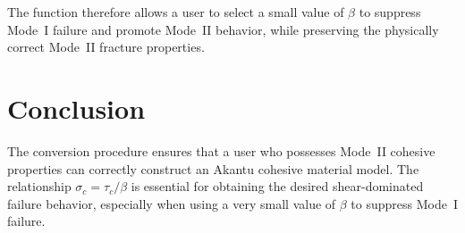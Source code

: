 \documentclass[a4paper, 12pt, oneside, onecolumn]{article}
\begin{document}
The function therefore allows a user to select a small value of $\beta$
to suppress Mode~I failure and promote Mode~II behavior, while preserving 
the physically correct Mode~II fracture properties.

%
%
%
%
%

\section{Conclusion}

The conversion procedure ensures that a user who possesses Mode~II cohesive 
properties can correctly construct an Akantu cohesive material model. The 
relationship $\sigma_{c}=\tau_{c}/\beta$ is essential for obtaining the desired 
shear-dominated failure behavior, especially when using a very small value of 
$\beta$ to suppress Mode~I failure.
\end{document}

